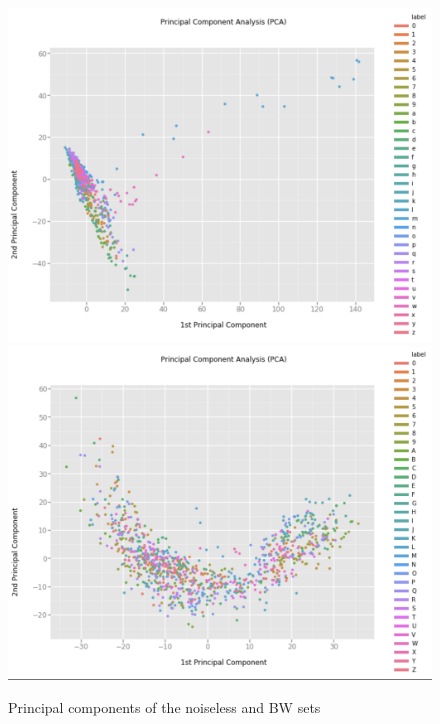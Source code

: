 \documentclass[twocolumn,10pt]{article}
\begin{document}
\begin{center}
\begin{figure}
\includegraphics[width=\linewidth]{sutd_pca.png}
  \includegraphics[width=\linewidth]{bw_pca.png}
  \caption{Principal components of the noiseless and BW sets}
  \label{fig:pca}
\end{figure}


\end{center}
\end{document}
